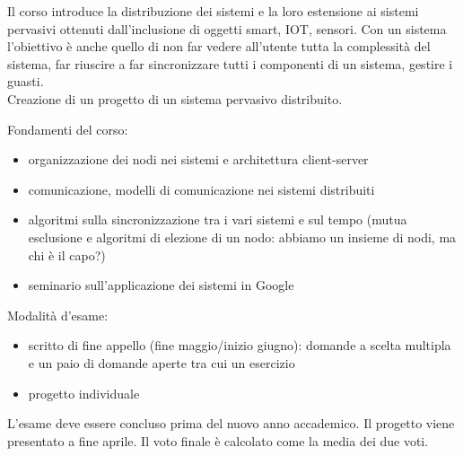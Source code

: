 Il corso introduce la distribuzione dei sistemi e la loro estensione ai sistemi pervasivi ottenuti dall'inclusione di oggetti smart, IOT, sensori. 
Con un sistema l'obiettivo è anche quello di non far vedere all'utente tutta la complessità del sistema, far riuscire a far sincronizzare tutti i componenti di un sistema, gestire i guasti.
\\ Creazione di un progetto di un sistema pervasivo distribuito. 

Fondamenti del corso:
\begin{itemize}
    \item organizzazione dei nodi nei sistemi e architettura client-server
    \item comunicazione, modelli di comunicazione nei sistemi distribuiti
    \item algoritmi sulla sincronizzazione tra i vari sistemi e sul tempo (mutua esclusione e algoritmi di elezione di un nodo: abbiamo un insieme di nodi, ma chi è il capo?)
    \item seminario sull'applicazione dei sistemi in Google
\end{itemize}

Modalità d'esame: 
\begin{itemize}
    \item scritto di fine appello (fine maggio/inizio giugno): domande a scelta multipla e un paio di domande aperte tra cui un esercizio
    \item progetto individuale
\end{itemize}
L'esame deve essere concluso prima del nuovo anno accademico. Il progetto viene presentato a fine aprile.
Il voto finale è calcolato come la media dei due voti.


